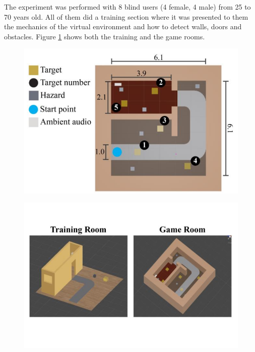 The experiment was performed with 8 blind users (4 female, 4 male) from 25 to 70 years old. All of them did a training section where it was presented to them the mechanics of the virtual environment and how to detect walls, doors and obstacles. Figure \ref{fig:siu_vr_rooms} shows both the training and the game rooms.

\begin{figure}[h]
\centering
\begin{minipage}{.45\textwidth}
    \centering
    \includegraphics[width=\textwidth]{Revisao/VR Without Vision/VR without vision map.png}
    \label{fig:siu_vr_targets}
\end{minipage}
\hfil
\begin{minipage}{.45\textwidth}
    \centering
    \includegraphics[width=\textwidth]{Revisao/VR Without Vision/VR without vision rooms.png}
    \label{fig:siu_vr_rooms}
\end{minipage}
\end{figure}

